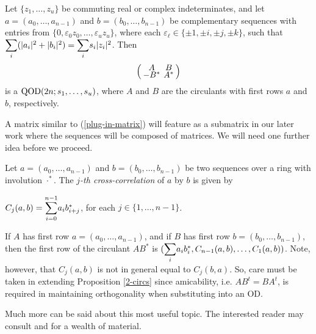 \documentclass[../../../main]{subfiles}
\begin{document}
 \begin{prop}\label{2-circs}
  Let $\{z_1,\dots,z_u\}$ be commuting real or complex indeterminates, and let
  $a=(a_0,\dots,a_{n-1})$ and $b=(b_0,\dots,b_{n-1})$ be complementary sequences
  with entries from $\{0,\varepsilon_0z_0, \dots, \varepsilon_uz_u\}$, where
  each $\varepsilon_\ell \in \{\pm 1, \pm i, \pm j, \pm k\}$, such that
  $\ssum_i(|a_i|^2 + |b_i|^2)=\ssum_is_i\abs{z_i}^2$. Then 
  \begin{equation}\label{plug-in-matrix}
  \arraycolsep=2.0pt\def\arraystretch{0.5}
   \left(\begin{array}{cc}
    A&B\\-B^*&A^*
   \end{array}\right)
  \end{equation}
  is a $\text{QOD}(2n;s_1,\dots,s_u)$, where $A$ and $B$ are the circulants with first rows $a$ and $b$, respectively.
 \end{prop}

 A matrix similar to (\ref{plug-in-matrix}) will feature as a submatrix in our
 later work where the sequences will be composed of matrices. We will need one
 further idea before we proceed.  

 \begin{defin}
  Let $a=(a_0,\dots,a_{n-1})$ and $b=(b_0,\dots,b_{n-1})$ be two sequences over
  a ring with involution $\cdot^*$. The {\it $j$-th cross-correlation} of $a$ by
  $b$ is given by 
  \begin{defenum}
   \item $C_j(a,b)=\ssum_{i=0}^{n-1}a_ib_{i+j}^*$, for each $j \in \{1,\dots,n-1\}$.
  \end{defenum}
 \end{defin}
 
 If $A$ has first row $a=(a_0,\dots,a_{n-1})$, and if $B$ has first row
 $b=(b_0,\dots,b_{n-1})$, then the first row of the circulant $AB^*$ is
 $(\ssum_ia_ib_i^*,C_{n-1}(a,b),\dots,C_1(a,b))$. Note, however, that $C_j(a,b)$
 is not in general equal to $C_j(b,a)$. So, care must be taken in extending
 Proposition \ref{2-circs} since amicability, i.e. $AB^t=BA^t$, is required in maintaining
 orthogonality when substituting into an OD. 
 
 Much more can be said about this most useful topic. The interested reader 
 may consult \cite{seberry-od-2017} and \cite{seberry-yamada-hmatrices-designs}
 for a wealth of material. 

  \biblio
\end{document}
